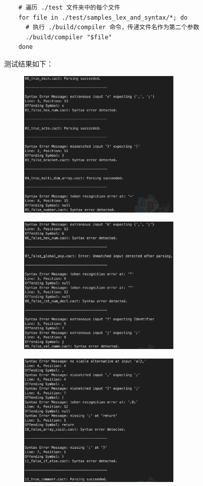 \documentclass[UTF8]{report}
\begin{document}
\begin{lstlisting}
    # 遍历 ./test 文件夹中的每个文件
    for file in ./test/samples_lex_and_syntax/*; do
      # 执行 ./build/compiler 命令，传递文件名作为第二个参数
      ./build/compiler "$file"
    done
\end{lstlisting}

测试结果如下：

\begin{figure}[H]
    \centering
    \includegraphics[width=0.7\textwidth]{fig/res00_05.png}
\end{figure}

\begin{figure}[H]
    \centering
    \includegraphics[width=0.7\textwidth]{fig/res06_09.png}
\end{figure}

\begin{figure}[H]
    \centering
    \includegraphics[width=0.7\textwidth]{fig/res10_12.png}
\end{figure}
\end{document}

